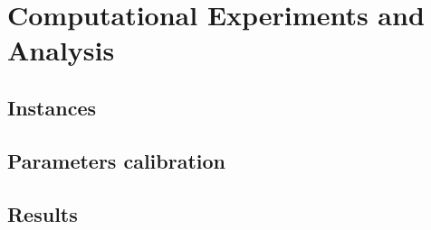 \chapter{Computational Experiments and Analysis}

\section{Instances}

\section{Parameters calibration}

\section{Results}